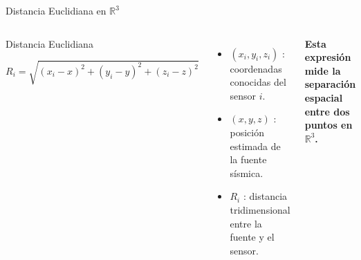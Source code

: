 
\begin{frame}{Distancia Euclidiana en $\mathbb{R}^3$}

    \begin{columns}[c]


        \begin{block}{Distancia Euclidiana}

            \centering
            \small

            \[
            R_i =
            \sqrt{
            (x_i-x)^2 +
            (y_i-y)^2 +
            (z_i-z)^2
            }
            \]

        \end{block}

        \vspace{0.25cm}

        \small
        \begin{itemize}

            \item $(x_i,y_i,z_i)$ : coordenadas conocidas del sensor $i$.

            \vspace{0.2cm}

            \item $(x,y,z)$ : posición estimada de la fuente sísmica.

            \vspace{0.2cm}

            \item $R_i$ : distancia tridimensional entre la fuente y el sensor.

        \end{itemize}

        \vspace{0.2cm}

        \begin{center}
            \small
            \textbf{
            Esta expresión mide la separación espacial entre dos puntos en $\mathbb{R}^3$.
            }
        \end{center}



\end{columns}
\end{frame}
